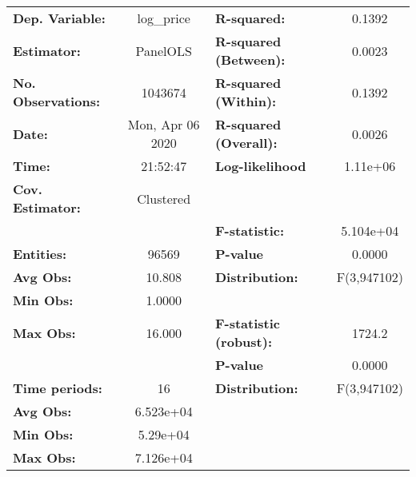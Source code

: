 \documentclass{report}
\begin{document}
\begin{center}
\begin{tabular}{lclc}
\toprule
\textbf{Dep. Variable:}        &     log\_price     & \textbf{  R-squared:         }   &      0.1392      \\
\textbf{Estimator:}            &      PanelOLS      & \textbf{  R-squared (Between):}  &      0.0023      \\
\textbf{No. Observations:}     &      1043674       & \textbf{  R-squared (Within):}   &      0.1392      \\
\textbf{Date:}                 &  Mon, Apr 06 2020  & \textbf{  R-squared (Overall):}  &      0.0026      \\
\textbf{Time:}                 &      21:52:47      & \textbf{  Log-likelihood     }   &     1.11e+06     \\
\textbf{Cov. Estimator:}       &     Clustered      & \textbf{                     }   &                  \\
\textbf{}                      &                    & \textbf{  F-statistic:       }   &    5.104e+04     \\
\textbf{Entities:}             &       96569        & \textbf{  P-value            }   &      0.0000      \\
\textbf{Avg Obs:}              &       10.808       & \textbf{  Distribution:      }   &   F(3,947102)    \\
\textbf{Min Obs:}              &       1.0000       & \textbf{                     }   &                  \\
\textbf{Max Obs:}              &       16.000       & \textbf{  F-statistic (robust):} &      1724.2      \\
\textbf{}                      &                    & \textbf{  P-value            }   &      0.0000      \\
\textbf{Time periods:}         &         16         & \textbf{  Distribution:      }   &   F(3,947102)    \\
\textbf{Avg Obs:}              &     6.523e+04      & \textbf{                     }   &                  \\
\textbf{Min Obs:}              &      5.29e+04      & \textbf{                     }   &                  \\
\textbf{Max Obs:}              &     7.126e+04      & \textbf{                     }   &                  \\
\bottomrule
\end{tabular}
\begin{tabular}{lcccccc}

\end{tabular}
\end{center}
\end{document}
